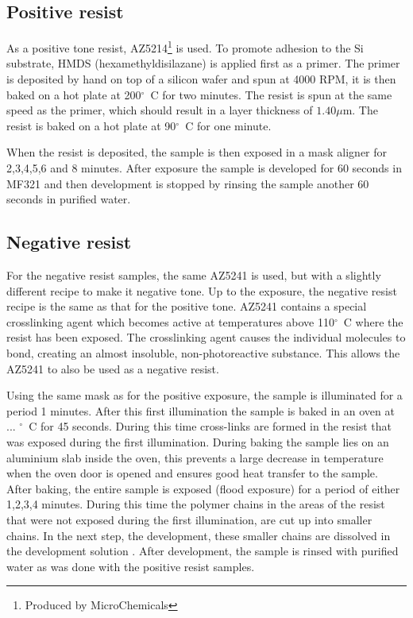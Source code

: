 \subsection*{Positive resist}
As a positive tone resist, AZ5214\footnote{Produced by MicroChemicals} is used. To promote adhesion to the Si substrate, HMDS (hexamethyldisilazane) is applied first as a primer. The primer is deposited by hand on top of a silicon wafer and spun at 4000 RPM, it is then baked on a hot plate at 200$^{\circ}$~C for two minutes. The resist is spun at the same speed as the primer, which should result in a layer thickness of $1.40 \mu$m. The resist is baked on a hot plate at 90$^{\circ}$~C for one minute.

When the resist is deposited, the sample is then exposed in a mask aligner for 2,3,4,5,6 and 8 minutes. After exposure the sample is developed for 60 seconds in MF321 and then development is stopped by rinsing the sample another 60 seconds in purified water.

\subsection*{Negative resist}
For the negative resist samples, the same AZ5241 is used, but with a slightly different recipe to make it negative tone. Up to the exposure, the negative resist recipe is the same as that for the positive tone. AZ5241 contains a special crosslinking agent which becomes active at temperatures above 110$^{\circ}$~C where the resist has been exposed. The crosslinking agent causes the individual molecules to bond, creating an almost insoluble, non-photoreactive substance. This allows the AZ5241 to also be used as a negative resist.

Using the same mask as for the positive exposure, the sample is illuminated for a period 1  minutes. After this first illumination the sample is baked in an oven at ...  $^\circ$~C for 45 seconds. During this time cross-links are formed in the resist that was exposed during the first illumination. During baking the sample lies on an aluminium slab inside the oven, this prevents a large decrease in temperature when the oven door is opened and ensures good heat transfer to the sample. After baking, the entire sample is exposed (flood exposure) for a period of either 1,2,3,4  minutes. During this time the polymer chains in the areas of the resist that were not exposed during the first illumination, are cut up into smaller chains. In the next step, the development, these smaller chains are dissolved in the development solution . After development, the sample is rinsed with purified water as was done with the positive resist samples.